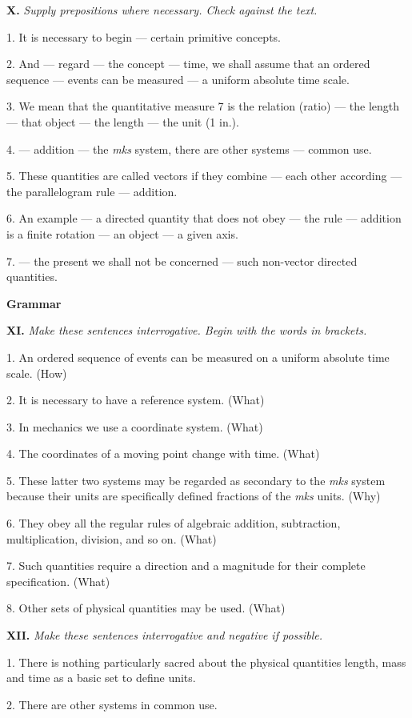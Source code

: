 \documentclass[a4paper]{article}
\newcommand{\ESect}[1]{\medskip\par{\large \textbf{#1}}\par}
\newcommand{\ETask}[2]{\medskip\par\textbf{#1.} \textit{#2}\par}
\begin{document}
\ETask{X}{Supply prepositions where necessary. Check against the text.}
1. It is necessary to begin --- certain primitive concepts.

2. And --- regard --- the concept --- time, we shall assume that an ordered sequence --- events can be measured --- a uniform
absolute time scale.

3. We mean that the quantitative measure 7 is the relation (ratio) --- the length --- that object --- the length --- the unit (1 in.).

4. --- addition --- the \textit{mks} system, there are other systems --- common use.

5. These quantities are called vectors if they combine --- each other according --- the parallelogram rule --- addition.

6. An example --- a directed quantity that does not obey --- the rule --- addition is a finite rotation --- an object --- a given axis.

7. --- the present we shall not be concerned --- such non-vector directed quantities.

\ESect{Grammar}

\ETask{XI}{Make these sentences interrogative. Begin with the words in brackets.}
1. An ordered sequence of events can be measured on a uniform absolute time scale. (How)

2. It is necessary to have a reference system. (What)

3. In mechanics we use a coordinate system. (What)

4. The coordinates of a moving point change with time. (What)

5. These latter two systems may be regarded as secondary to the \textit{mks} system because their units are specifically defined
fractions of the \textit{mks} units. (Why)

6. They obey all the regular rules of algebraic addition, subtraction, multiplication, division, and so on. (What)

7. Such quantities require a direction and a magnitude for their complete specification. (What)

8. Other sets of physical quantities may be used. (What)

\ETask{XII}{Make these sentences interrogative and negative if possible.}

1. There is nothing particularly sacred about the physical quantities length, mass and time as a basic set to define units.

2. There are other systems in common use.
\end{document}
